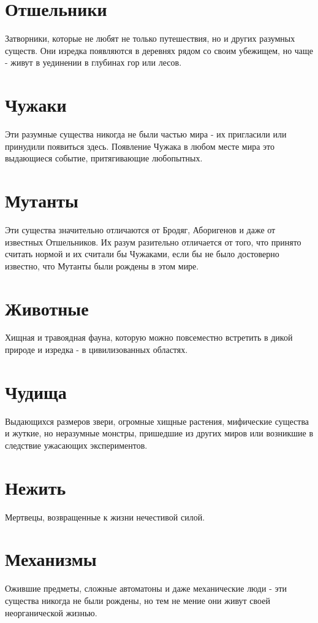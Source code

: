 \section{Отшельники}
Затворники, которые не любят не только путешествия, но и других разумных существ. Они изредка появляются в деревнях рядом со своим убежищем, но чаще - живут в уединении в глубинах гор или лесов.

\section{Чужаки}
Эти разумные существа никогда не были частью мира - их пригласили или принудили появиться здесь. Появление Чужака в любом месте мира это выдающиеся событие, притягивающие любопытных.

\section{Мутанты}
Эти существа значительно отличаются от Бродяг, Аборигенов и даже от известных Отшельников. Их разум разительно отличается от того, что принято считать нормой и их считали бы Чужаками, если бы не было достоверно известно, что Мутанты были рождены в этом мире.

\section{Животные}
Хищная и травоядная фауна, которую можно повсеместно встретить в дикой природе и изредка - в цивилизованных областях.

\section{Чудища}
Выдающихся размеров звери, огромные хищные растения, мифические существа и жуткие, но неразумные монстры, пришедшие из других миров или возникшие в следствие ужасающих экспериментов.

\section{Нежить}
Мертвецы, возвращенные к жизни нечестивой силой.

\section{Механизмы}
Ожившие предметы, сложные автоматоны и даже механические люди - эти существа никогда не были рождены, но тем не мение они живут своей неорганической жизнью.

